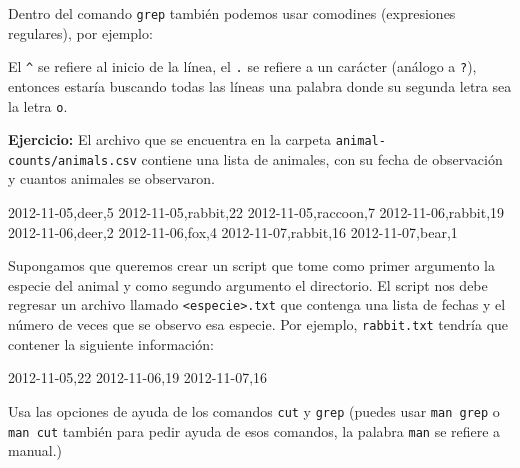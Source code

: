 \documentclass[
]{book}
\newenvironment{Shaded}{\begin{snugshade}}{\end{snugshade}}
\newcommand{\AttributeTok}[1]{\textcolor[rgb]{0.13,0.29,0.53}{#1}}
\newcommand{\ExtensionTok}[1]{#1}
\newcommand{\NormalTok}[1]{#1}
\newcommand{\StringTok}[1]{\textcolor[rgb]{0.31,0.60,0.02}{#1}}
\begin{document}
Dentro del comando \texttt{grep} también podemos usar comodines (expresiones regulares), por ejemplo:

\begin{Shaded}
\end{Shaded}

El \texttt{\^{}} se refiere al inicio de la línea, el \texttt{.} se refiere a un carácter (análogo a \texttt{?}), entonces estaría buscando todas las líneas una palabra donde su segunda letra sea la letra \texttt{o}.

\textbf{Ejercicio:} El archivo que se encuentra en la carpeta \texttt{animal-counts/animals.csv} contiene una lista de animales, con su fecha de observación y cuantos animales se observaron.

\begin{Shaded}
\begin{Highlighting}[]
\NormalTok{2012{-}11{-}05,deer,5}
\NormalTok{2012{-}11{-}05,rabbit,22}
\NormalTok{2012{-}11{-}05,raccoon,7}
\NormalTok{2012{-}11{-}06,rabbit,19}
\NormalTok{2012{-}11{-}06,deer,2}
\NormalTok{2012{-}11{-}06,fox,4}
\NormalTok{2012{-}11{-}07,rabbit,16}
\NormalTok{2012{-}11{-}07,bear,1}
\end{Highlighting}
\end{Shaded}

Supongamos que queremos crear un script que tome como primer argumento la especie del animal y como segundo argumento el directorio. El script nos debe regresar un archivo llamado \texttt{\textless{}especie\textgreater{}.txt} que contenga una lista de fechas y el número de veces que se observo esa especie. Por ejemplo, \texttt{rabbit.txt} tendría que contener la siguiente información:

\begin{Shaded}
\begin{Highlighting}[]
\ExtensionTok{2012{-}11{-}05,22}
\ExtensionTok{2012{-}11{-}06,19}
\ExtensionTok{2012{-}11{-}07,16}
\end{Highlighting}
\end{Shaded}

Usa las opciones de ayuda de los comandos \texttt{cut} y \texttt{grep} (puedes usar \texttt{man\ grep} o \texttt{man\ cut} también para pedir ayuda de esos comandos, la palabra \texttt{man} se refiere a manual.)
\end{document}

